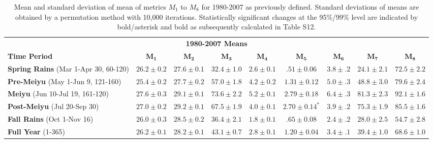 \begin{table}[p]

\centering

\caption{Mean and standard deviation of mean of metrics $M_1$ to $M_8$ for 1980-2007 as previously defined. Standard deviations of means are obtained by a permutation method with 10,000 iterations. Statistically significant changes at the 95\%/99\% level are indicated by bold/asterisk and bold as subsequently calculated in Table S12.}

\begin{tabular}{ l c c c c c c c c}
	 \multicolumn{9}{c}{\textbf{1980-2007 Means}} \\
	 \textbf{Time Period} 						& $\boldsymbol{M_1}$ & $\boldsymbol{M_2}$ 		& $\boldsymbol{M_3}$ & $\boldsymbol{M_4}$ & $\boldsymbol{M_5}$ & $\boldsymbol{M_6}$ & $\boldsymbol{M_7}$ & $\boldsymbol{M_8}$ \\	 \hline
	\textbf{Spring Rains} (Mar 1-Apr 30, 60-120)  	& $26.2 \pm 0.2$ 	&  $\boldsymbol{27.6 \pm 0.1}$	&  $32.4 \pm 1.0$ 	&$2.6 \pm 0.1$ 	& $.51 \pm 0.06$ 		& $3.8 \pm .2$ & $24.1 \pm 2.1$ & $72.5 \pm 2.2$  \\
	\textbf{Pre-Meiyu} (May 1-Jun 9, 121-160)  	& $25.4 \pm 0.2$ 	&  $27.7 \pm 0.2$				&  $57.0 \pm 1.8$ 	&$4.2 \pm 0.2$	& $1.31 \pm 0.12$ 	& $5.0 \pm .3$ & $48.8 \pm 3.0$ & $79.6 \pm 2.4$ \\
	\textbf{Meiyu} (Jun 10-Jul 19, 161-120)		& $27.6 \pm 0.3$ 	&  $29.1 \pm 0.1$				&  $73.6 \pm 2.2$ 	&$5.2 \pm 0.1$ 	& $2.79 \pm 0.18$		& $6.4 \pm .3$ & $81.3 \pm 2.3$ & $92.1 \pm 1.6$ \\
	\textbf{Post-Meiyu} (Jul 20-Sep 30) 			& $27.0 \pm 0.2 $	&  $29.2 \pm 0.1$ 				&  $67.5 \pm 1.9$ 	&$4.0 \pm 0.1$ 	& $\boldsymbol{2.70 \pm 0.14^*}$		& $3.9 \pm .2$ & $75.3 \pm 1.9$ & $85.5 \pm 1.6$ \\
	\textbf{Fall Rains} (Oct 1-Nov 16) 				& $26.0 \pm 0.3 $ 	&  $28.5 \pm 0.2$				&  $36.4 \pm 2.1$ 	&$1.8 \pm 0.1$	& $.65 \pm 0.08$ 		& $2.4 \pm .2$ & $28.0 \pm 2.5$ & $54.7 \pm 2.8$ \\
	\textbf{Full Year} (1-365)					& $26.2 \pm 0.1$ 	&  $28.2 \pm 0.1$ 				&  $43.1 \pm 0.7$ 	&$2.8 \pm 0.1$ 	& $\boldsymbol{1.20 \pm 0.04}$		& $3.4 \pm .1$ & $39.4 \pm 1.0$ & $68.6 \pm 1.0$ \\
\end{tabular}
\label{ts4}
\end{table}


